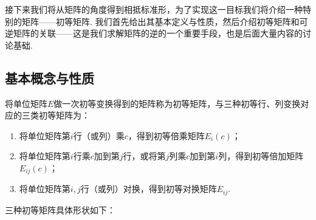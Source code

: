 接下来我们将从矩阵的角度得到相抵标准形，为了实现这一目标我们将介绍一种特别的矩阵——初等矩阵. 我们首先给出其基本定义与性质，然后介绍初等矩阵和可逆矩阵的关联——这是我们求解矩阵的逆的一个重要手段，也是后面大量内容的讨论基础.

\subsection{基本概念与性质}

\begin{definition}{}{}
    将单位矩阵$E$做一次初等变换得到的矩阵称为初等矩阵，与三种初等行、列变换对应的三类初等矩阵为：
    \begin{enumerate}
        \item 将单位矩阵第$i$行（或列）乘$c$，得到初等倍乘矩阵$E_i(c)$；

        \item 将单位矩阵第$i$行乘$c$加到第$j$行，或将第$j$列乘$c$加到第$i$列，得到初等倍加矩阵$E_{ij}(c)$；

        \item 将单位矩阵第$i,j$行（或列）对换，得到初等对换矩阵$E_{ij}$.
    \end{enumerate}
\end{definition}
三种初等矩阵具体形状如下：

